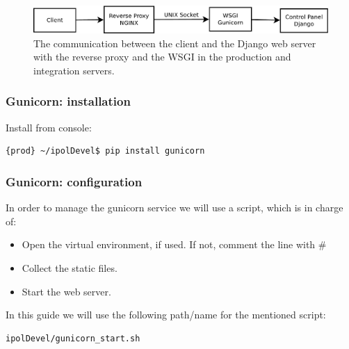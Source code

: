 \begin{figure}[!ht]
\centering
\includegraphics[width=1\columnwidth]{sysadmin/images/prod_int.pdf}
\caption{The communication between the client and the Django web server with the reverse proxy and the WSGI in the production and integration servers.}
\label{fig:prod_int_architecture}
\end{figure}


\subsubsection{Gunicorn: installation}

Install from console:
\begin{lstlisting}[language=Bash]
{prod} ~/ipolDevel$ pip install gunicorn
\end{lstlisting}

\subsubsection{Gunicorn: configuration}
In order to manage the gunicorn service we will use a script, which is in charge of:
\begin{itemize}
\item Open the virtual environment, if used. If not, comment the line with \#
\item Collect the static files.
\item Start the web server.
\end{itemize}

In this guide we will use the following path/name for the mentioned script:
\begin{lstlisting}[language=Bash]
ipolDevel/gunicorn_start.sh
\end{lstlisting}

